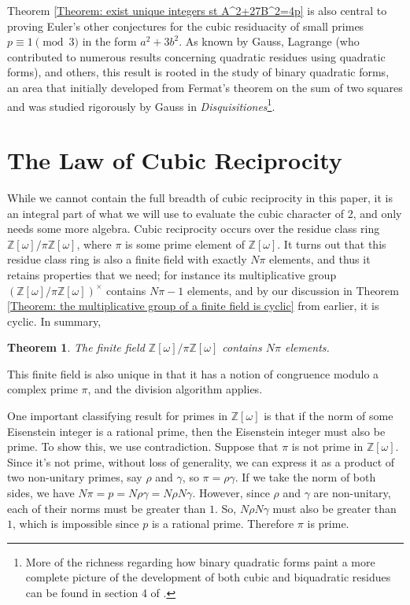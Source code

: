 \documentclass[10pt]{amsart}
\newcommand{\ZZ}{\mathbb{Z}}
\theoremstyle{plain}
\newtheorem{thm}{Theorem}
\theoremstyle{definition}
\theoremstyle{remark}
\numberwithin{equation}{section}
\begin{document}
Theorem \ref{Theorem: exist unique integers st A^2+27B^2=4p} is also central to proving Euler's other conjectures for the cubic residuacity of small primes $p\equiv 1\pmod{3}$ in the form $a^{2}+3b^{2}$. As known by Gauss, Lagrange (who contributed to numerous results concerning quadratic residues using quadratic forms), and others, this result is rooted in the study of binary quadratic forms, an area that initially developed from Fermat's theorem on the sum of two squares and was studied rigorously by Gauss in \textit{Disquisitiones}\footnote{More of the richness regarding how binary quadratic forms paint a more complete picture of the development of both cubic and biquadratic residues can be found in section 4 of \cite{cox2013primes}.}.

\section*{The Law of Cubic Reciprocity}
While we cannot contain the full breadth of cubic reciprocity in this paper, it is an integral part of what we will use to evaluate the cubic character of 2, and only needs some more algebra. Cubic reciprocity occurs over the residue class ring $\ZZ[\omega]/\pi\ZZ[\omega]$, where $\pi$ is some prime element of $\ZZ[\omega]$. It turns out that this residue class ring is also a finite field with exactly $N\pi$ elements, and thus it retains properties that we need; for instance its multiplicative group $(\ZZ[\omega]/\pi\ZZ[\omega])^{\times}$ contains $N\pi-1$ elements, and by our discussion in Theorem \ref{Theorem: the multiplicative group of a finite field is cyclic} from earlier, it is cyclic. In summary,

\begin{thm} \label{Theorem: residue class ring contains Npi elements}
    The finite field $\ZZ[\omega]/\pi \ZZ[\omega]$ contains $N\pi$ elements. 
\end{thm}

This finite field is also unique in that it has a notion of congruence modulo a complex prime $\pi$, and the division algorithm applies. 

\indent One important classifying result for primes in $\ZZ[\omega]$ is that if the norm of some Eisenstein integer is a rational prime, then the Eisenstein integer must also be prime. To show this, we use contradiction. Suppose that $\pi$ is not prime in $\ZZ[\omega]$. Since it's not prime, without loss of generality, we can express it as a product of two non-unitary primes, say $\rho$ and $\gamma$, so $\pi=\rho\gamma$. If we take the norm of both sides, we have $N\pi=p=N\rho\gamma=N\rho N\gamma$. However, since $\rho$ and $\gamma$ are non-unitary, each of their norms must be greater than $1$. So, $N\rho N\gamma$ must also be greater than $1$, which is impossible since $p$ is a rational prime. Therefore $\pi$ is prime. 
\end{document}
